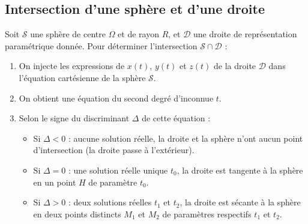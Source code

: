 \begin{center}
\end{center}

\subsection{Intersection d'une sphère et d'une droite}

Soit $\mathcal{S}$ une sphère de centre $\Omega$ et de rayon $R$, et $\mathcal{D}$ une droite de représentation paramétrique donnée.
Pour déterminer l'intersection $\mathcal{S} \cap \mathcal{D}$ :
\begin{enumerate}
    \item On injecte les expressions de $x(t)$, $y(t)$ et $z(t)$ de la droite $\mathcal{D}$ dans l'équation cartésienne de la sphère $\mathcal{S}$.
    \item On obtient une équation du second degré d'inconnue $t$.
    \item Selon le signe du discriminant $\Delta$ de cette équation :
    \begin{itemize}
        \item Si $\Delta < 0$ : aucune solution réelle, la droite et la sphère n'ont aucun point d'intersection (la droite passe à l'extérieur).
        \item Si $\Delta = 0$ : une solution réelle unique $t_0$, la droite est tangente à la sphère en un point $H$ de paramètre $t_0$.
        \item Si $\Delta > 0$ : deux solutions réelles $t_1$ et $t_2$, la droite est sécante à la sphère en deux points distincts $M_1$ et $M_2$ de paramètres respectifs $t_1$ et $t_2$.
    \end{itemize}
\end{enumerate}

